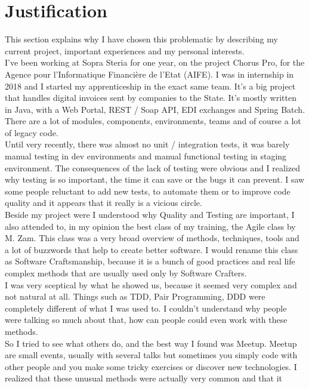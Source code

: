 \section{Justification}\label{sec:justification}
This section explains why I have chosen this problematic by describing my
current project, important experiences and my personal interests. \\
I've been working at Sopra Steria for one year, on the project Chorus Pro,
for the Agence pour l'Informatique Financi\`{e}re de l'Etat (AIFE).
I was in internship in 2018 and I started my apprenticeship in the exact
same team.
It's a big project that handles digital invoices sent by companies to the
State.
It's mostly written in Java, with a Web Portal, REST / Soap API, EDI
exchanges and Spring Batch.
There are a lot of modules, components, environments, teams and of course
a lot of legacy code. \\
Until very recently, there was almost no unit / integration tests, it was
barely manual testing in dev environments and manual functional testing
in staging environment.
The consequences of the lack of testing were obvious and I realized why
testing is so important, the time it can save or the bugs it can prevent.
I saw some people reluctant to add new tests, to automate them or to improve
code quality and it appears that it really is a vicious circle. \\
\newline
Beside my project were I understood why Quality and Testing are important,
I also attended to, in my opinion the best class of my training, the Agile
class by M. Zam.
This class was a very broad overview of methods, techniques, tools and a lot
of buzzwords that help to create better software.
I would rename this class as Software Craftsmanship, because it is a bunch
of good practices and real life complex methods that are usually used only
by Software Crafters. \\
I was very sceptical by what he showed us, because it seemed very complex
and not natural at all.
Things such as TDD, Pair Programming, DDD were completely different of what
I was used to.
I couldn't understand why people were talking so much about that, how can
people could even work with these methods. \\
So I tried to see what others do, and the best way I found was Meetup.
Meetup are small events, usually with several talks but sometimes you simply
code with other people and you make some tricky exercises or discover new
technologies.
I realized that these unusual methods were actually very common and that it
